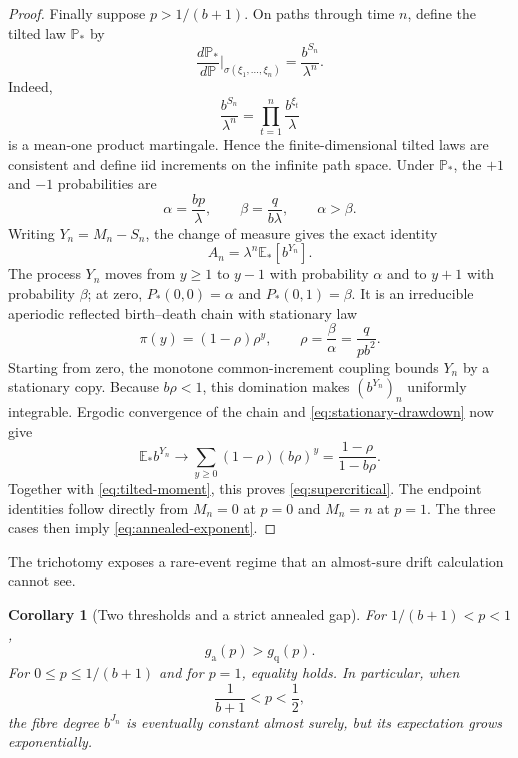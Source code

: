\documentclass[11pt,a4paper]{amsart}
\newtheorem{corollary}[theorem]{Corollary}
\theoremstyle{definition}
\theoremstyle{remark}
\newcommand{\Prob}{\mathbb P}
\newcommand{\Exp}{\mathbb E}
\begin{document}
\begin{proof}
Finally suppose $p>1/(b+1)$.  On paths through time $n$, define the tilted
law $\Prob_*$ by
\begin{equation}\label{eq:exponential-tilt}
 \frac{d\Prob_*}{d\Prob}\bigg|_{\sigma(\xi_1,\ldots,\xi_n)}
 =\frac{b^{S_n}}{\lambda^n}.
\end{equation}
Indeed,
\[
 \frac{b^{S_n}}{\lambda^n}
 =\prod_{t=1}^n\frac{b^{\xi_t}}{\lambda}
\]
is a mean-one product martingale.  Hence the finite-dimensional tilted laws
are consistent and define iid increments on the infinite path space.
Under $\Prob_*$, the $+1$ and $-1$ probabilities are
\begin{equation}\label{eq:tilted-probabilities}
 \alpha=\frac{bp}{\lambda},
 \qquad
 \beta=\frac{q}{b\lambda},
 \qquad \alpha>\beta.
\end{equation}
Writing $Y_n=M_n-S_n$, the change of measure gives the exact identity
\begin{equation}\label{eq:tilted-moment}
 A_n=\lambda^n\Exp_*[b^{Y_n}].
\end{equation}
The process $Y_n$ moves from $y\geq1$ to $y-1$ with probability $\alpha$
and to $y+1$ with probability $\beta$; at zero,
$P_*(0,0)=\alpha$ and $P_*(0,1)=\beta$.  It is an irreducible aperiodic
reflected birth--death chain with
stationary law
\begin{equation}\label{eq:stationary-drawdown}
 \pi(y)=(1-\rho)\rho^y,
 \qquad
 \rho=\frac\beta\alpha=\frac{q}{pb^2}.
\end{equation}
Starting from zero, the monotone common-increment coupling bounds $Y_n$ by
a stationary copy.  Because $b\rho<1$, this domination makes
$(b^{Y_n})_n$ uniformly integrable.  Ergodic convergence of the chain and
\eqref{eq:stationary-drawdown} now give
\[
 \Exp_*b^{Y_n}\longrightarrow
 \sum_{y\geq0}(1-\rho)(b\rho)^y
 =\frac{1-\rho}{1-b\rho}.
\]
Together with \eqref{eq:tilted-moment}, this proves
\eqref{eq:supercritical}.  The endpoint identities follow directly from
$M_n=0$ at $p=0$ and $M_n=n$ at $p=1$.  The three cases then imply
\eqref{eq:annealed-exponent}.
\end{proof}

The trichotomy exposes a rare-event regime that an almost-sure drift
calculation cannot see.

\begin{corollary}[Two thresholds and a strict annealed gap]
\label{cor:two-thresholds}
For $1/(b+1)<p<1$,
\begin{equation}\label{eq:strict-gap}
 g_{\mathrm a}(p)>g_{\mathrm q}(p).
\end{equation}
For $0\leq p\leq1/(b+1)$ and for $p=1$, equality holds.  In particular,
when
\begin{equation}\label{eq:intermediate-window}
 \frac1{b+1}<p<\frac12,
\end{equation}
the fibre degree $b^{J_n}$ is eventually constant almost surely, but its
expectation grows exponentially.
\end{corollary}
\end{document}
